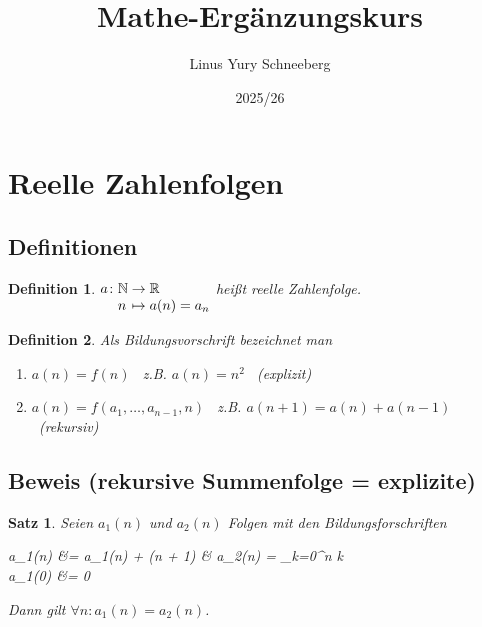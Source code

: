 \documentclass{article}
\title{Mathe-Ergänzungskurs}
\author{Linus Yury Schneeberg}
\date{2025/26}
\newcommand\func[5]{%
	\begingroup
	\setlength\arraycolsep{0pt}
	#1\colon\begin{array}[t]{l >{{}}c<{{}} l}
		#2 & \to & #3 \\ #4 & \mapsto & #5 
	\end{array}%
	\endgroup}
\newtheorem{thm}{Satz}[section]
\newtheorem{defn}{Definition}[section]
\newenvironment{aleq*}{\begin{equation*}\begin{aligned}}{\end{aligned}\end{equation*}}
\begin{document}
	\maketitle
	\tableofcontents
	\newpage
	
	\section{Reelle Zahlenfolgen}
	\subsection{Definitionen}
	\begin{defn}
	$\func{a}{\mathbb{N}}{\mathbb{R}}{n}{a(n)=a_n}$ heißt reelle Zahlenfolge.
	\end{defn}
	\begin{defn}
	Als Bildungsvorschrift bezeichnet man 
	\begin{enumerate}[label=(\alph*)]
		\item \(a(n) = f(n)\) \ z.B. \(a(n) = n^2\) \ (explizit)
		\item \(a(n) = f(a_1, \dots, a_{n-1}, n)\) \ z.B. \(a(n+1) = a(n) + a(n-1)\) \ (rekursiv)
	\end{enumerate}
\end{defn}
	
	\subsection{Beweis (rekursive Summenfolge = explizite)}
	\begin{thm}
	Seien \(a_1(n)\) und \(a_2(n)\) Folgen mit den Bildungsforschriften
	\begin{aleq*}
			a_1(n) &= a_1(n) + (n + 1) & a_2(n) = \sum_{k=0}^{n} k \\
			a_1(0) &= 0 
	\end{aleq*}
	\par
	Dann gilt \(\forall n \colon a_1(n) = a_2(n)\).
	\end{thm}
	
\end{document}
